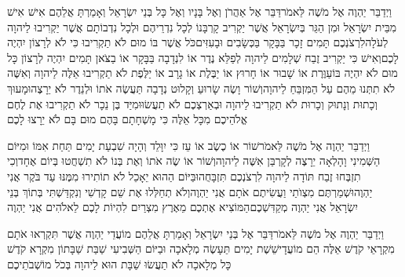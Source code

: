 \documentclass[../main/main.tex]{subfiles}
\begin{document}
\begin{multicols*}{\ncols}
וַיְדַבֵּר יַהְוֶה אֶל מֹשֶׁה לֵּאמֹר\PreVerseSpace{}דַּבֵּר אֶל אַהֲרֹן וְאֶל בָּנָיו וְאֶל כָּל בְּנֵי יִשְׂרָאֵל וְאָמַרְתָּ אֲלֵהֶם אִישׁ אִישׁ מִבֵּית יִשְׂרָאֵל וּמִן הַגֵּר בְּיִשְׂרָאֵל אֲשֶׁר יַקְרִיב קָרְבָּנוֹ לְכָל נִדְרֵיהֶם וּלְכָל נִדְבוֹתָם אֲשֶׁר יַקְרִיבוּ לַיהוָה לְעֹלָה\PreVerseSpace{}לִרְצֹנְכֶם תָּמִים זָכָר בַּבָּקָר בַּכְּשָׂבִים וּבָעִזִּים\PreVerseSpace{}כֹּל אֲשֶׁר בּוֹ מוּם לֹא תַקְרִיבוּ כִּי לֹא לְרָצוֹן יִהְיֶה לָכֶם\PreVerseSpace{}וְאִישׁ כִּי יַקְרִיב זֶבַח שְׁלָמִים לַיהוָה לְפַלֵּא נֶדֶר אוֹ לִנְדָבָה בַּבָּקָר אוֹ בַצֹּאן תָּמִים יִהְיֶה לְרָצוֹן כָּל מוּם לֹא יִהְיֶה בּוֹ\PreVerseSpace{}עַוֶּרֶת אוֹ שָׁבוּר אוֹ חָרוּץ אוֹ יַבֶּלֶת אוֹ גָרָב אוֹ יַלֶּפֶת לֹא תַקְרִיבוּ אֵלֶּה לַיהוָה וְאִשֶּׁה לֹא תִתְּנוּ מֵהֶם עַל הַמִּזְבֵּחַ לַיהוָה\PreVerseSpace{}וְשׁוֹר וָשֶׂה שָׂרוּעַ וְקָלוּט נְדָבָה תַּעֲשֶׂה אֹתוֹ וּלְנֵדֶר לֹא יֵרָצֶה\PreVerseSpace{}וּמָעוּךְ וְכָתוּת וְנָתוּק וְכָרוּת לֹא תַקְרִיבוּ לַיהוָה וּבְאַרְצְכֶם לֹא תַעֲשׂוּ\PreVerseSpace{}וּמִיַּד בֶּן נֵכָר לֹא תַקְרִיבוּ אֶת לֶחֶם אֱלֹהֵיכֶם מִכָּל אֵלֶּה כִּי מָשְׁחָתָם בָּהֶם מוּם בָּם לֹא יֵרָצוּ לָכֶם\OpenSection{}\par
{}וַיְדַבֵּר יַהְוֶה אֶל מֹשֶׁה לֵּאמֹר\PreVerseSpace{}שׁוֹר אוֹ כֶשֶׂב אוֹ עֵז כִּי יִוָּלֵד וְהָיָה שִׁבְעַת יָמִים תַּחַת אִמּוֹ וּמִיּוֹם הַשְּׁמִינִי וָהָלְאָה יֵרָצֶה לְקָרְבַּן אִשֶּׁה לַיהוָה\PreVerseSpace{}וְשׁוֹר אוֹ שֶׂה אֹתוֹ וְאֶת בְּנוֹ לֹא תִשְׁחֲטוּ בְּיוֹם אֶחָד\PreVerseSpace{}וְכִי תִזְבְּחוּ זֶבַח תּוֹדָה לַיהוָה לִרְצֹנְכֶם תִּזְבָּחֻהוּ\SubEnd{}\PreVerseSpace{}בַּיּוֹם הַהוּא יֵאָכֵל לֹא תוֹתִירוּ מִמֶּנּוּ עַד בֹּקֶר אֲנִי יַהְוֶה\PreVerseSpace{}וּשְׁמַרְתֶּם מִצְוֺתַי וַעֲשִׂיתֶם אֹתָם אֲנִי יַהְוֶה\PreVerseSpace{}וְלֹא תְחַלְּלוּ אֶת שֵׁם קָדְשִׁי וְנִקְדַּשְׁתִּי בְּתוֹךְ בְּנֵי יִשְׂרָאֵל אֲנִי יַהְוֶה מְקַדִּשְׁכֶם\PreVerseSpace{}הַמּוֹצִיא אֶתְכֶם מֵאֶרֶץ מִצְרַיִם לִהְיוֹת לָכֶם לֵאלֹהִים אֲנִי יַהְוֶה\OpenSection{}\par
{}וַיְדַבֵּר יַהְוֶה אֶל מֹשֶׁה לֵּאמֹר\PreVerseSpace{}דַּבֵּר אֶל בְּנֵי יִשְׂרָאֵל וְאָמַרְתָּ אֲלֵהֶם מוֹעֲדֵי יַהְוֶה אֲשֶׁר תִּקְרְאוּ אֹתָם מִקְרָאֵי קֹדֶשׁ אֵלֶּה הֵם מוֹעֲדָי\PreVerseSpace{}שֵׁשֶׁת יָמִים תֵּעָשֶׂה מְלָאכָה וּבַיּוֹם הַשְּׁבִיעִי שַׁבַּת שַׁבָּתוֹן מִקְרָא קֹדֶשׁ כָּל מְלָאכָה לֹא תַעֲשׂוּ שַׁבָּת הוּא לַיהוָה בְּכֹל מוֹשְׁבֹתֵיכֶם\OpenSection{}\par

\end{multicols*}
\end{document}
